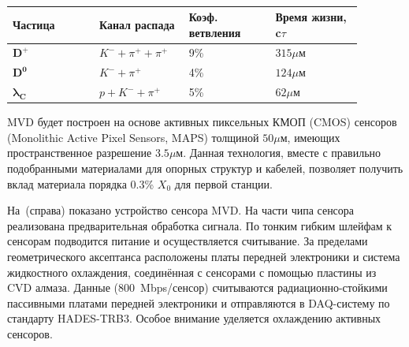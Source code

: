 \begin{table}[H]
\caption{}
\label{tabl:MVDphys}
\begin{tabular}{ | p{0.22\linewidth} | p{0.22\linewidth} | p{0.22\linewidth} | p{0.22\linewidth} | }
\hline
\textbf{Частица} & \textbf{Канал} \newline \textbf{распада} & \textbf{Коэф.} \newline \textbf{ветвления} & \textbf{Время жизни, c$\tau$} \\
\hline
$\mathbf{D^{+}}$ & $K^{-} + \pi^{+} + \pi^{+}$ & 9\% & $315 \mu$м \\
\hline
$\mathbf{D^{0}}$ & $K^{-} + \pi^{+}$ & 4\% & $124 \mu$м \\
\hline
$\mathbf{\lambda_{C}}$ & $p + K^{-} + \pi^{+}$ & 5\% & $62 \mu$м \\
\hline
\end{tabular}
\end{table}

MVD будет построен на основе активных пиксельных КМОП (CMOS) сенсоров (Monolithic Active Pixel Sensors, MAPS) толщиной $50 \mu$м, имеющих пространственное разрешение $3.5 \mu$м. Данная технология, вместе с правильно подобранными материалами для опорных структур и кабелей, позволяет получить вклад материала порядка 0.3\% $X_{0}$ для первой станции.




На~(справа) показано устройство сенсора MVD.
На части чипа сенсора реализована предварительная обработка сигнала.
По тонким гибким шлейфам к сенсорам подводится питание и осуществляется считывание.
За пределами геометрического аксептанса расположены платы передней электроники и система жидкостного охлаждения, соединённая с сенсорами с помощью пластины из CVD алмаза.
Данные (800~Mbps/сенсор) считываются радиационно-стойкими пассивными платами передней электроники и отправляются в DAQ-систему по стандарту HADES-TRB3.
Особое внимание уделяется охлаждению активных сенсоров.

